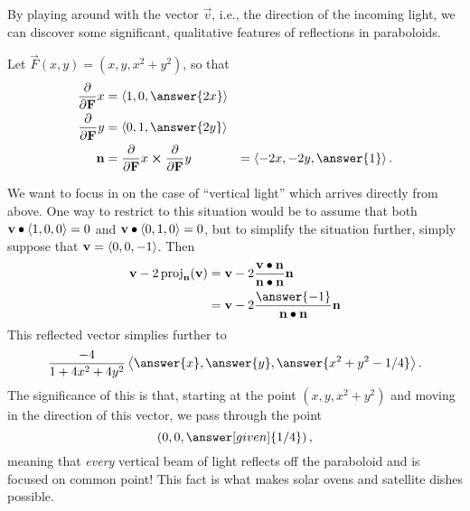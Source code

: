\documentclass{ximera}
\begin{document}
\begin{example}
  By playing around with the vector $\vec{v}$, i.e., the direction of
  the incoming light, we can discover some significant, qualitative
  features of reflections in paraboloids.

  Let $\vec{F}(x,y) = (x,y,x^2 + y^2)$, so that
  \begin{align*}
    \pp{\vec{F}}{x} &= \vector{ 1, 0, \answer{2x}} \\
    \pp{\vec{F}}{y} &= \vector{0, 1, \answer{2y}} \\
    \vec{n} &= \pp{\vec{F}}{x} \cross \pp{\vec{F}}{y} &= \vector{-2x, -2y, \answer{1}}. \\
  \end{align*}

  We want to focus in on the case of ``vertical light'' which arrives directly from above.  One way to 
  restrict to this situation would be to assume that both $\mathbf{v} \bullet \langle 1, 0, 0 \rangle = 0$ and
  $\mathbf{v} \bullet \left\langle  0, 1, 0 \right\rangle = 0$, but to simplify the situation further, simply suppose
  that $\mathbf{v} = \left\langle  0, 0, -1 \right\rangle$.  Then
  \begin{align*}
    \vec{v} - 2 \proj_{\vec{n}} (\vec{v}) 
    &= \vec{v} - 2 \frac{\vec{v} \dotp \vec{n}}{\vec{n} \dotp \vec{n}} \vec{n} \\
    &= \vec{v} - 2 \frac{\answer{-1}}{\vec{n} \dotp \vec{n}} \vec{n} \\
  \end{align*}
  This reflected vector simplies further to
  \[
    \frac{-4}{1 + 4x^2 + 4y^2} \vector{\answer{x}, \answer{y}, \answer{x^2 + y^2 - 1/4}}.
  \]
  The significance of this is that, starting at the point
  $(x,y,x^2 + y^2)$ and moving in the direction of this vector, we pass through the point 
  \[
    \left( 0, 0, \answer[given]{1/4} \right),
  \]
  meaning that \textit{every} vertical beam of light reflects off the
  paraboloid and is focused on common point!  This fact is what makes
  solar ovens and satellite dishes possible.
  
\end{example}
\end{document}
